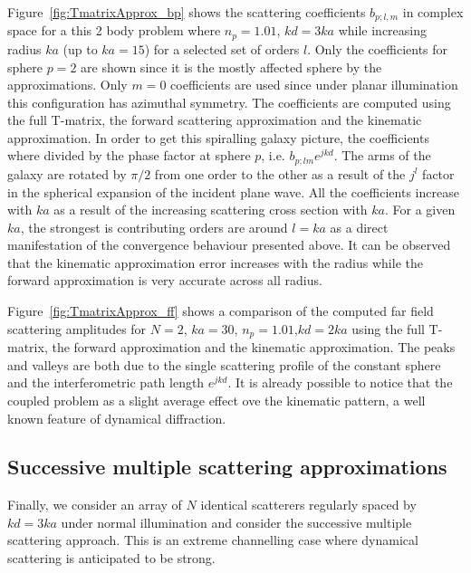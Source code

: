 Figure~\ref{fig:TmatrixApprox_bp} shows the scattering coefficients $b_{p;l,m}$
in complex space for a this 2 body problem where $n_p=1.01$, $kd=3ka$
while increasing radius $ka$ (up to $ka=15$) for a selected set of orders $l$.
Only the coefficients for sphere $p=2$ are shown since it is the mostly affected
sphere by the approximations. Only $m=0$ coefficients are used since under
planar illumination this configuration has azimuthal symmetry.
The coefficients are computed using the full T-matrix, the forward
scattering approximation and the kinematic approximation. In order to get this
spiralling galaxy picture, the coefficients where divided by the phase factor at
sphere $p$, i.e. $b_{p;lm}e^{jkd}$. The arms of the galaxy are rotated by $\pi/2$
from one order to the other as a result of the $j^l$ factor in the spherical expansion
of the incident plane wave. All the coefficients increase with $ka$ as a result of
the increasing scattering cross section with $ka$. For a given $ka$, the strongest
is contributing orders are around $l=ka$ as a direct manifestation of the convergence
behaviour presented above. It can be observed that the kinematic approximation
error increases with the radius while the forward approximation is very accurate
across all radius.

Figure~\ref{fig:TmatrixApprox_ff} shows a comparison of the computed far field
scattering amplitudes for $N=2$, $ka=30$, $n_p=1.01$,$kd=2ka$ using the full
T-matrix, the forward approximation and the kinematic approximation. The peaks and
valleys are both due to the single scattering profile of the constant sphere and
the interferometric path length $e^{jkd}$. It is already possible to notice
that the coupled problem as a slight average effect ove the kinematic pattern, a
well known feature of dynamical diffraction.




\subsection{Successive multiple scattering approximations}

Finally, we consider an array of $N$ identical scatterers regularly spaced by
$kd=3ka$ under normal illumination and consider the successive multiple scattering
approach. This is an extreme channelling case where dynamical scattering is
anticipated to be strong.

